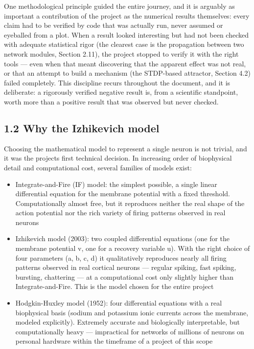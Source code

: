 \documentclass[
  english,
]{article}
\begin{document}
One methodological principle guided the entire journey, and it is arguably as important a contribution of the project as the numerical results themselves: every claim had to be verified by code that was actually run, never assumed or eyeballed from a plot. When a result looked interesting but had not been checked with adequate statistical rigor (the clearest case is the propagation between two network modules, Section 2.11), the project stopped to verify it with the right tools --- even when that meant discovering that the apparent effect was not real, or that an attempt to build a mechanism (the STDP-based attractor, Section 4.2) failed completely. This discipline recurs throughout the document, and it is deliberate: a rigorously verified negative result is, from a scientific standpoint, worth more than a positive result that was observed but never checked.

\subsection{1.2 Why the Izhikevich model}\label{why-the-izhikevich-model}

Choosing the mathematical model to represent a single neuron is not trivial, and it was the project\textquotesingle s first technical decision. In increasing order of biophysical detail and computational cost, several families of models exist:

\begin{itemize}
\item
  Integrate-and-Fire (IF) model: the simplest possible, a single linear differential equation for the membrane potential with a fixed threshold. Computationally almost free, but it reproduces neither the real shape of the action potential nor the rich variety of firing patterns observed in real neurons
\item
  Izhikevich model (2003): two coupled differential equations (one for the membrane potential v, one for a recovery variable u). With the right choice of four parameters (a, b, c, d) it qualitatively reproduces nearly all firing patterns observed in real cortical neurons --- regular spiking, fast spiking, bursting, chattering --- at a computational cost only slightly higher than Integrate-and-Fire. This is the model chosen for the entire project
\item
  Hodgkin-Huxley model (1952): four differential equations with a real biophysical basis (sodium and potassium ionic currents across the membrane, modeled explicitly). Extremely accurate and biologically interpretable, but computationally heavy --- impractical for networks of millions of neurons on personal hardware within the timeframe of a project of this scope
\end{itemize}
\end{document}
